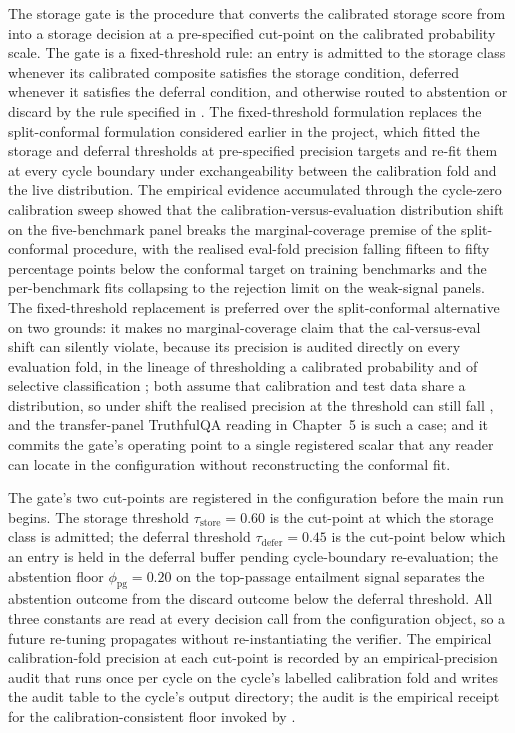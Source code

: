The storage gate is the procedure that converts the calibrated storage score from  into a storage decision at a pre-specified cut-point on the calibrated probability scale. The gate is a fixed-threshold rule: an entry is admitted to the storage class whenever its calibrated composite satisfies the storage condition, deferred whenever it satisfies the deferral condition, and otherwise routed to abstention or discard by the rule specified in . The fixed-threshold formulation replaces the split-conformal formulation considered earlier in the project, which fitted the storage and deferral thresholds at pre-specified precision targets and re-fit them at every cycle boundary under exchangeability between the calibration fold and the live distribution. The empirical evidence accumulated through the cycle-zero calibration sweep showed that the calibration-versus-evaluation distribution shift on the five-benchmark panel breaks the marginal-coverage premise of the split-conformal procedure, with the realised eval-fold precision falling fifteen to fifty percentage points below the conformal target on training benchmarks and the per-benchmark fits collapsing to the rejection limit on the weak-signal panels. The fixed-threshold replacement is preferred over the split-conformal alternative on two grounds: it makes no marginal-coverage claim that the cal-versus-eval shift can silently violate, because its precision is audited directly on every evaluation fold, in the lineage of thresholding a calibrated probability \cite{niculescu2005predicting} and of selective classification \cite{geifman2017selective}; both assume that calibration and test data share a distribution, so under shift the realised precision at the threshold can still fall \cite{ovadia2019trust,kamath2020selective}, and the transfer-panel TruthfulQA reading in Chapter~5 is such a case; and it commits the gate's operating point to a single registered scalar that any reader can locate in the configuration without reconstructing the conformal fit.

The gate's two cut-points are registered in the configuration before the main run begins. The storage threshold $\tau_{\text{store}} = 0.60$ is the cut-point at which the storage class is admitted; the deferral threshold $\tau_{\text{defer}} = 0.45$ is the cut-point below which an entry is held in the deferral buffer pending cycle-boundary re-evaluation; the abstention floor $\phi_{\text{pg}} = 0.20$ on the top-passage entailment signal separates the abstention outcome from the discard outcome below the deferral threshold. All three constants are read at every decision call from the configuration object, so a future re-tuning propagates without re-instantiating the verifier. The empirical calibration-fold precision at each cut-point is recorded by an empirical-precision audit that runs once per cycle on the cycle's labelled calibration fold and writes the audit table to the cycle's output directory; the audit is the empirical receipt for the calibration-consistent floor invoked by .

